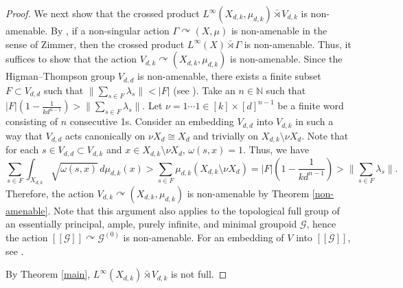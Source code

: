 \documentclass{amsart}
\theoremstyle{remark}
\theoremstyle{definition}
\begin{document}
\begin{proof}
We next show that the crossed product $L^{\infty}(X_{d, k}, \mu_{d, k}) \bar{\rtimes} V_{d, k}$ is non-amenable.
By \cite{Zimmer2}, if a non-singular action $\Gamma \curvearrowright (X, \mu)$ is non-amenable in the sense of Zimmer, then the crossed product $L^{\infty}(X) \bar{\rtimes} \Gamma$ is non-amenable.
Thus, it suffices to show that the action $V_{d, k} \curvearrowright (X_{d, k}, \mu_{d, k})$ is non-amenable.
Since the Higman--Thompson group $V_{d, d}$ is non-amenable, there exists a finite subset $F \subset V_{d, d}$ such that $\displaystyle \| \sum _{s \in F} \lambda _s \| < |F|$ (see \cite[Theorem 2.6.8]{BrownOzawa}).
Take an $n \in \mathbb{N}$ such that $\displaystyle |F| \left( 1 - \frac{1}{kd^{n-1}} \right) > \| \sum _{s \in F} \lambda _s \|$.
Let $\nu = 1 \cdots 1 \in [k] \times [d]^{n-1}$ be a finite word consisting of $n$ consecutive 1s.
Consider an embedding $V_{d, d}$ into $V_{d, k}$ in such a way that $V_{d, d}$ acts canonically on $\nu X_d \cong X_d$  and trivially on $X_{d, k} \setminus \nu X_d$.
Note that for each $s \in V_{d, d} \subset V_{d, k}$ and $x \in X_{d, k} \setminus \nu X_d$, $\omega (s , x) =1$.
Thus, we have
\[
\sum _{s \in F} \int _{X_{d, k}} \sqrt{\omega (s, x)} \, d\mu_{d, k}(x) > \sum _{s \in F} \mu_{d, k} (X_{d, k} \setminus \nu X_d) = |F| \left( 1 - \frac{1}{kd^{n-1}} \right) > \| \sum _{s \in F} \lambda _s \|.
\]
Therefore, the action $V_{d, k} \curvearrowright (X_{d, k}, \mu_{d, k})$ is non-amenable by Theorem \ref{non-amenable}.
Note that this argument also applies to the topological full group of an essentially principal, ample, purely infinite, and minimal groupoid $\mathcal{G}$, hence the action $[[ \mathcal{G} ]] \curvearrowright \mathcal{G}^{(0)}$ is non-amenable.
For an embedding of $V$ into $[[ \mathcal{G} ]]$, see \cite[Proposition 3.7]{GardellaTanner}.

By Theorem \ref{main}, $L^{\infty} (X_{d, k}) \bar{\rtimes} V_{d, k}$ is not full.


\end{proof}
\end{document}

